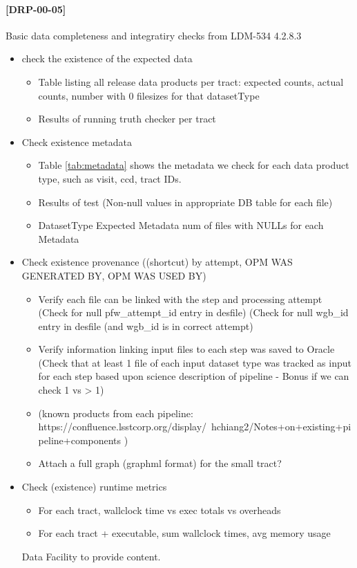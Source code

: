 \documentclass[DM,lsstdraft,STR,toc]{lsstdoc}
\begin{document}
\paragraph{[DRP-00-05]}
Basic data completeness and integratiry checks from LDM-534 4.2.8.3
\begin{itemize}
  \item check the existence of the expected data
  \begin{itemize}
    \item Table listing all release data products per tract:  expected counts, actual counts, number with 0 filesizes for that datasetType
    \item Results of running truth checker per tract
  \end{itemize}
  \item Check existence metadata
  \begin{itemize}
    \item Table \ref{tab:metadata} shows the metadata we check for each data product type, such as visit, ccd, tract IDs.

    \item Results of test (Non-null values in appropriate DB table for each file)
    \item DatasetType Expected Metadata num of files with NULLs for each Metadata
  \end{itemize}
  \item Check existence provenance ((shortcut) by attempt, OPM WAS GENERATED BY, OPM WAS USED BY)
  \begin{itemize}
    \item Verify each file can be linked with the step and processing attempt
          (Check for null pfw{\_}attempt{\_}id entry in desfile)
          (Check for null wgb{\_}id entry in desfile (and wgb{\_}id is in correct attempt)
    \item Verify information linking input files to each step was saved to Oracle
          (Check that at least 1 file of each input dataset type was tracked as input for each step based upon science description of pipeline - Bonus if we can check 1 vs > 1)
    \item (known products from each pipeline: https://confluence.lsstcorp.org/display/~hchiang2/Notes+on+existing+pipeline+components )
    \item Attach a full graph (graphml format) for the small tract?
  \end{itemize}
  \item Check (existence) runtime metrics
  \begin{itemize}
    \item For each tract, wallclock time vs exec totals vs overheads
    \item For each tract + executable, sum wallclock times, avg memory usage
  \end{itemize}
\begin{note}
Data Facility to provide content.
\end{note}
\end{itemize}
\end{document}
